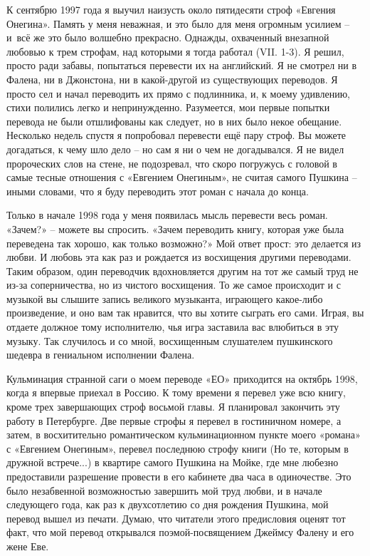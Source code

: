 \documentclass[../main.tex]{subfiles}
\begin{document}
К сентябрю 1997 года я выучил наизусть около пятидесяти строф «Евгения Онегина». Память у меня неважная, и это было для меня огромным усилием \--- и~всё же это было волшебно прекрасно. Однажды, охваченный внезапной любовью к трем строфам, над которыми я тогда работал (VII. 1-3). Я решил, просто ради забавы, попытаться перевести их на английский. Я не смотрел ни в Фалена, ни в Джонстона, ни в какой-другой из существующих переводов. Я просто сел и начал переводить их прямо с подлинника, и, к моему удивлению, стихи полились легко и непринужденно. Разумеется, мои первые попытки перевода не были отшлифованы как следует, но в них было некое обещание. Несколько недель спустя я попробовал перевести ещё пару строф. Вы можете догадаться, к чему шло дело \--- но сам я ни о чем не догадывался. Я не видел пророческих слов на стене, не подозревал, что скоро погружусь с головой в самые тесные отношения с «Евгением Онегиным», не считая самого Пушкина \--- иными словами, что я буду переводить этот роман с начала до конца.

Только в начале 1998 года у меня появилась мысль перевести весь роман.
«Зачем?» \--- можете вы спросить. «Зачем переводить книгу, которая уже была переведена так хорошо, как только возможно?» Мой ответ прост: это делается из любви. И любовь эта как раз и рождается из восхищения другими переводами. Таким образом, один переводчик вдохновляется другим на тот же самый труд не из-за соперничества, но из чистого восхищения. То же самое происходит и с музыкой вы слышите запись великого музыканта, играющего какое-либо произведение, и оно вам так нравится, что вы хотите сыграть его сами. Играя, вы отдаете должное тому исполнителю, чья игра заставила вас влюбиться в эту музыку. Так случилось и со мной, восхищенным слушателем пушкинского шедевра в гениальном исполнении Фалена.

Кульминация странной саги о моем переводе «ЕО» приходится на октябрь 1998, когда я впервые приехал в Россию. К тому времени я перевел уже всю книгу, кроме трех завершающих строф восьмой главы. Я планировал закончить эту работу в Петербурге. Две первые строфы я перевел в гостиничном номере, а затем, в восхитительно романтическом кульминационном пункте моего «романа» с «Евгением Онегиным», перевел последнюю строфу книги (Но те, которым в дружной встрече...) в квартире самого Пушкина на Мойке, где мне любезно предоставили разрешение провести в его кабинете два часа в одиночестве. Это было незабвенной возможностью завершить мой труд любви, и в начале следующего года, как раз к двухсотлетию со дня рождения Пушкина, мой перевод вышел из печати. Думаю, что читатели этого предисловия оценят тот факт, что мой перевод открывался поэмой-посвящением Джеймсу Фалену и его жене Еве.
\end{document}
